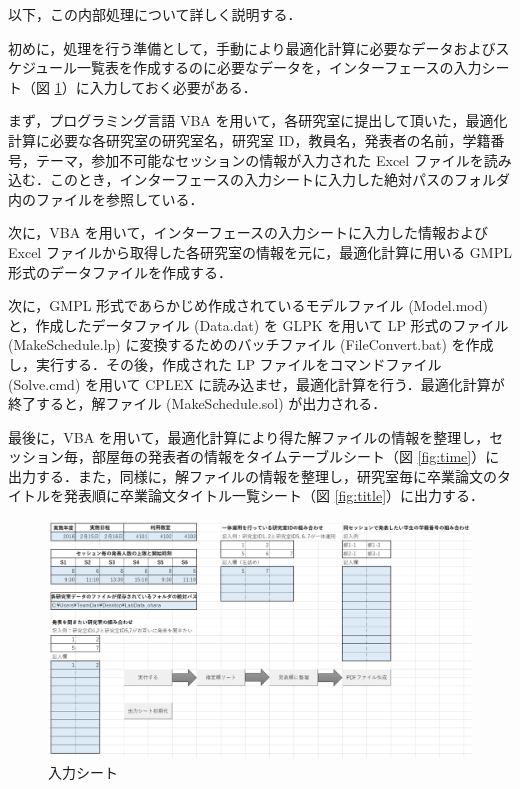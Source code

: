 \documentclass[a4paper,12pt,fleqn]{jarticle}
\begin{document}
\begin{flushleft} 以下，この内部処理について詳しく説明する．　　\end{flushleft}


初めに，処理を行う準備として，手動により最適化計算に必要なデータおよびスケジュール一覧表を作成するのに必要なデータを，インターフェースの入力シート（図 \ref{fig:inter}）に入力しておく必要がある．

 まず，プログラミング言語 VBA を用いて，各研究室に提出して頂いた，最適化計算に必要な各研究室の研究室名，研究室 ID，教員名，発表者の名前，学籍番号，テーマ，参加不可能なセッションの情報が入力された Excel ファイルを読み込む．このとき，インターフェースの入力シートに入力した絶対パスのフォルダ内のファイルを参照している．

次に，VBA を用いて，インターフェースの入力シートに入力した情報および Excel ファイルから取得した各研究室の情報を元に，最適化計算に用いる GMPL 形式のデータファイルを作成する．

次に，GMPL 形式であらかじめ作成されているモデルファイル (Model.mod) と，作成したデータファイル (Data.dat) を GLPK を用いて LP 形式のファイル (MakeSchedule.lp) に変換するためのバッチファイル (FileConvert.bat) を作成し，実行する．その後，作成された LP ファイルをコマンドファイル (Solve.cmd) を用いて CPLEX に読み込ませ，最適化計算を行う．最適化計算が終了すると，解ファイル (MakeSchedule.sol) が出力される．

最後に，VBA を用いて，最適化計算により得た解ファイルの情報を整理し，セッション毎，部屋毎の発表者の情報をタイムテーブルシート（図 \ref{fig:time}）に出力する．また，同様に，解ファイルの情報を整理し，研究室毎に卒業論文のタイトルを発表順に卒業論文タイトル一覧シート（図 \ref{fig:title}）に出力する．

\begin{figure}[H]
  \begin{center}
    \includegraphics[scale=0.55]{inter.png}
    \caption{入力シート}
    \label{fig:inter}
  \end{center}
\end{figure}
\end{document}
